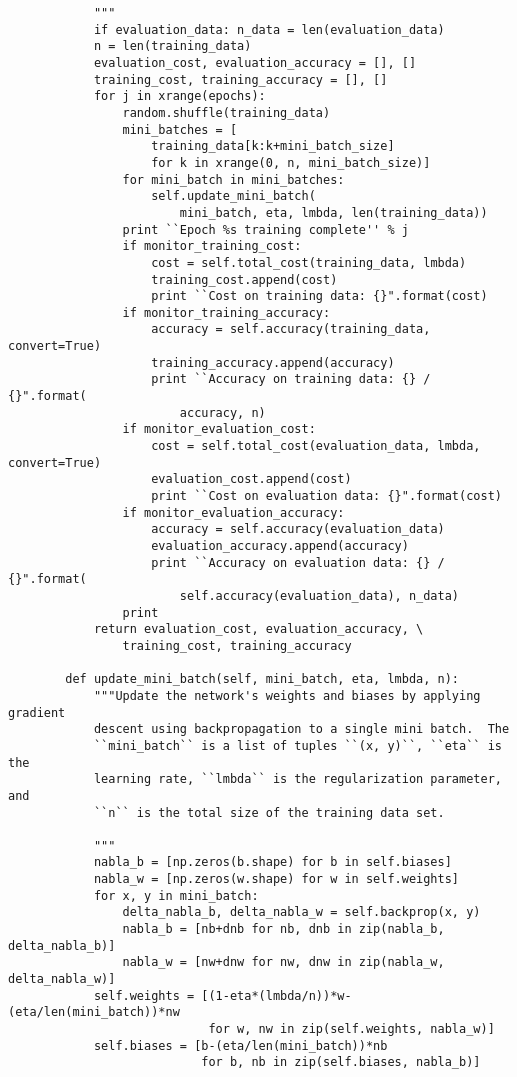 \begin{lstlisting}
            """
            if evaluation_data: n_data = len(evaluation_data)
            n = len(training_data)
            evaluation_cost, evaluation_accuracy = [], []
            training_cost, training_accuracy = [], []
            for j in xrange(epochs):
                random.shuffle(training_data)
                mini_batches = [
                    training_data[k:k+mini_batch_size]
                    for k in xrange(0, n, mini_batch_size)]
                for mini_batch in mini_batches:
                    self.update_mini_batch(
                        mini_batch, eta, lmbda, len(training_data))
                print ``Epoch %s training complete'' % j
                if monitor_training_cost:
                    cost = self.total_cost(training_data, lmbda)
                    training_cost.append(cost)
                    print ``Cost on training data: {}".format(cost)
                if monitor_training_accuracy:
                    accuracy = self.accuracy(training_data, convert=True)
                    training_accuracy.append(accuracy)
                    print ``Accuracy on training data: {} / {}".format(
                        accuracy, n)
                if monitor_evaluation_cost:
                    cost = self.total_cost(evaluation_data, lmbda, convert=True)
                    evaluation_cost.append(cost)
                    print ``Cost on evaluation data: {}".format(cost)
                if monitor_evaluation_accuracy:
                    accuracy = self.accuracy(evaluation_data)
                    evaluation_accuracy.append(accuracy)
                    print ``Accuracy on evaluation data: {} / {}".format(
                        self.accuracy(evaluation_data), n_data)
                print
            return evaluation_cost, evaluation_accuracy, \
                training_cost, training_accuracy
    
        def update_mini_batch(self, mini_batch, eta, lmbda, n):
            """Update the network's weights and biases by applying gradient
            descent using backpropagation to a single mini batch.  The
            ``mini_batch`` is a list of tuples ``(x, y)``, ``eta`` is the
            learning rate, ``lmbda`` is the regularization parameter, and
            ``n`` is the total size of the training data set.
    
            """
            nabla_b = [np.zeros(b.shape) for b in self.biases]
            nabla_w = [np.zeros(w.shape) for w in self.weights]
            for x, y in mini_batch:
                delta_nabla_b, delta_nabla_w = self.backprop(x, y)
                nabla_b = [nb+dnb for nb, dnb in zip(nabla_b, delta_nabla_b)]
                nabla_w = [nw+dnw for nw, dnw in zip(nabla_w, delta_nabla_w)]
            self.weights = [(1-eta*(lmbda/n))*w-(eta/len(mini_batch))*nw
                            for w, nw in zip(self.weights, nabla_w)]
            self.biases = [b-(eta/len(mini_batch))*nb
                           for b, nb in zip(self.biases, nabla_b)]
    

\end{lstlisting}
